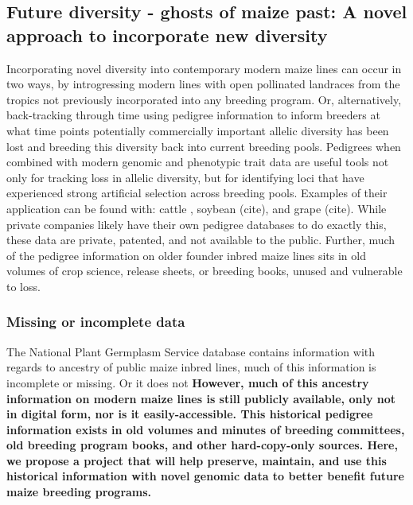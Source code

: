 \documentclass[12pt]{article}
\begin{document}
\subsection*{Future diversity - ghosts of maize past: A novel approach to incorporate new diversity}
\par Incorporating novel diversity into contemporary modern maize lines can occur in two ways, by introgressing modern lines with open pollinated landraces from the tropics not previously incorporated into any breeding program. Or, alternatively, back-tracking through time using pedigree information to inform breeders at what time points potentially commercially important allelic diversity has been lost and breeding this diversity back into current breeding pools. Pedigrees when combined with modern genomic and phenotypic trait data are useful tools not only for tracking loss in allelic diversity, but for identifying loci that have experienced strong artificial selection across breeding pools. Examples of their application can be found with: cattle \citep{Decker:2012kd}, soybean (cite), and grape (cite). While private companies likely have their own pedigree databases to do exactly this, these data are private, patented, and not available to the public. 
Further, much of the pedigree information on older founder inbred maize lines sits in old volumes of crop science, release sheets, or breeding books, unused and vulnerable to loss.
\subsubsection*{Missing or incomplete data}
\par The National Plant Germplasm Service database contains information with regards to ancestry of public maize inbred lines, much of this information is incomplete or missing. Or it does not 
\textbf{However, much of this ancestry information on modern maize lines  is still publicly available, only not in digital form, nor is it easily-accessible. This historical pedigree information exists in old volumes and minutes of breeding committees, old breeding program books, and other hard-copy-only sources. Here, we propose a project that will help preserve, maintain, and use this historical information with novel genomic data to better benefit future maize breeding programs.} 
\end{document}
